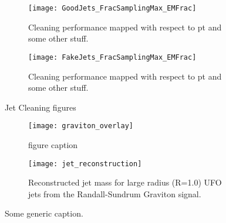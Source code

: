 \documentclass[12pt]{article}
\begin{document}
\newpage

\begin{figure}[t]
    \centering
    \begin{subfigure}[t]{.45\textwidth}
        \centering
        \texttt{[image: GoodJets\_FracSamplingMax\_EMFrac]}
        \caption{Cleaning performance mapped with respect to pt and some other stuff.}
        \label{subfig:tight_th2}
    \end{subfigure}
    \hfill
    \begin{subfigure}[t]{.45\textwidth}
        \centering
        \texttt{[image: FakeJets\_FracSamplingMax\_EMFrac]}
        \caption{Cleaning performance mapped with respect to pt and some other stuff.}
        \label{subfig:tenacious_th2}
    \end{subfigure} %
\caption{Jet Cleaning figures}
\label{fig:cleaning_performance_subfigure}
\end{figure}

\begin{figure}[t]
    \centering
    \begin{subfigure}[t]{.48\textwidth}
        \centering
        \texttt{[image: graviton\_overlay]}
        \caption{figure caption}
        \label{subfig:graviton_overlay}
    \end{subfigure}
    \hfill
    \begin{subfigure}[t]{.48\textwidth}
        \centering
        \texttt{[image: jet\_reconstruction]}
        \caption{Reconstructed jet mass for large radius (R=1.0) UFO jets from
        the Randall-Sundrum Graviton signal.}
        \label{subfig:ufo_rsg_reconstruction}
    \end{subfigure} %
\caption{Some generic caption.}
\label{fig:some_generic_figure}
\end{figure}

\newpage
\newpage
{}
\end{document}
